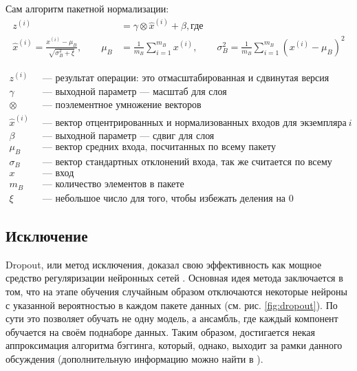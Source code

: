 Сам алгоритм пакетной нормализации:
\begin{align*}
	z^{(i)} & = \gamma \otimes \hat x^{(i)} + \beta, \text{где}        \\
	\hat x^{(i)} = \frac{x^{(i)} - \mu_B}{\sqrt{\sigma^2_B + \xi}}, \qquad
	\mu_B   & = \frac{1}{m_B} \sum\limits_{i = 1}^{m_B}x^{(i)}, \qquad
	\sigma_B^2 = \frac{1}{m_B} \sum\limits_{i = 1}^{m_B}(x^{(i)} - \mu_B)^2
\end{align*}

\begin{align*}
	z^{(i)}      & \: \text{ --- результат операции: это отмасштабированная и сдвинутая версия входов}  \\
	\gamma       & \: \text{ --- выходной параметр --- масштаб для слоя}                                \\
	\otimes      & \: \text{ --- поэлементное умножение векторов}                                       \\
	\hat x^{(i)} & \: \text{ --- вектор отцентрированных и нормализованных входов для экземпляра} \: i  \\
	\beta        & \: \text{ --- выходной параметр --- сдвиг для слоя}                                  \\
	\mu_B        & \: \text{ --- вектор средних входа, посчитанных по всему пакету}                     \\
	\sigma_B     & \: \text{ --- вектор стандартных отклонений входа, так же считается по всему пакету} \\
	x            & \: \text{ --- вход}                                                                  \\
	m_B          & \: \text{ --- количество элементов в пакете}                                         \\
	\xi          & \: \text{ --- небольшое число для того, чтобы избежать деления на 0}
\end{align*}

\subsection{Исключение}

Dropout, или метод исключения, доказал свою эффективность как мощное средство
регуляризации нейронных сетей \cite{dropout-is-good}. Основная идея метода
заключается в том, что на этапе обучения случайным образом отключаются
некоторые нейроны с указанной вероятностью в каждом пакете данных (см. рис.
\ref{fig:dropout}). По сути это позволяет обучать не одну модель, а ансамбль,
где каждый компонент обучается на своём поднаборе данных. Таким образом,
достигается некая аппроксимация алгоритма бэггинга, который, однако, выходит за
рамки данного обсуждения (дополнительную информацию можно найти в
\cite{goodfellow}).

